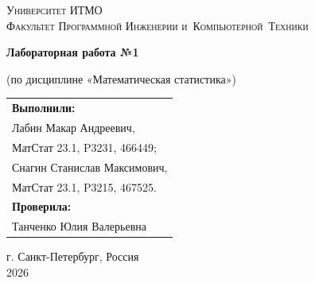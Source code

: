 \begin{titlepage}
    \begin{center}
        \large
        \textsc{Университет ИТМО\\
        Факультет Программной Инженерии и~Компьютерной~Техники}
        \vspace*{4cm}
            
        \LARGE
        \textbf{Лабораторная работа №1}

        \vspace{0.5cm}
        \LARGE
            
        \vspace{0.5cm}
        \large
        (по дисциплине «Математическая статистика»)

        \vspace{1.5cm}

        \hfill\large
        \begin{tabular}{@{}l@{}}
        \textbf{Выполнили:}\\[2mm]
        Лабин Макар Андреевич,\\
        МатСтат 23.1, P3231, 466449;\\
        Снагин Станислав Максимович,\\
        МатСтат 23.1, P3215, 467525.\\[2mm]
        \textbf{Проверила:}\\[2mm]
        Танченко Юлия Валерьевна
        \end{tabular}
            
        \vfill
            
        \vspace{0.8cm}
            
            
        \Large
        г. Санкт-Петербург, Россия\\
        2026
            
    \end{center}
\end{titlepage}

\renewcommand{\thefootnote}{[\arabic{footnote}]}